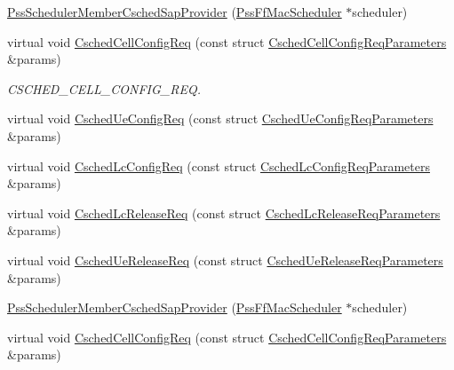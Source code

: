 \begin{DoxyCompactItemize}
\item 
\hyperlink{classns3_1_1PssSchedulerMemberCschedSapProvider_a7d005ca73b85cdd1162b1fc10912025b}{Pss\+Scheduler\+Member\+Csched\+Sap\+Provider} (\hyperlink{classns3_1_1PssFfMacScheduler}{Pss\+Ff\+Mac\+Scheduler} $\ast$scheduler)
\item 
virtual void \hyperlink{classns3_1_1PssSchedulerMemberCschedSapProvider_ac6119cf011f6559c7300ad1a307265b3}{Csched\+Cell\+Config\+Req} (const struct \hyperlink{structns3_1_1FfMacCschedSapProvider_1_1CschedCellConfigReqParameters}{Csched\+Cell\+Config\+Req\+Parameters} \&params)
\begin{DoxyCompactList}\small\item\em C\+S\+C\+H\+E\+D\+\_\+\+C\+E\+L\+L\+\_\+\+C\+O\+N\+F\+I\+G\+\_\+\+R\+EQ. \end{DoxyCompactList}\item 
virtual void \hyperlink{classns3_1_1PssSchedulerMemberCschedSapProvider_a66d0d3d2e4fa66eaf87375dbefe09cbe}{Csched\+Ue\+Config\+Req} (const struct \hyperlink{structns3_1_1FfMacCschedSapProvider_1_1CschedUeConfigReqParameters}{Csched\+Ue\+Config\+Req\+Parameters} \&params)
\item 
virtual void \hyperlink{classns3_1_1PssSchedulerMemberCschedSapProvider_ac759acac77492a6dfa2b1f265f6cd46a}{Csched\+Lc\+Config\+Req} (const struct \hyperlink{structns3_1_1FfMacCschedSapProvider_1_1CschedLcConfigReqParameters}{Csched\+Lc\+Config\+Req\+Parameters} \&params)
\item 
virtual void \hyperlink{classns3_1_1PssSchedulerMemberCschedSapProvider_a5866508a403aa114e5445dc4a1a211bc}{Csched\+Lc\+Release\+Req} (const struct \hyperlink{structns3_1_1FfMacCschedSapProvider_1_1CschedLcReleaseReqParameters}{Csched\+Lc\+Release\+Req\+Parameters} \&params)
\item 
virtual void \hyperlink{classns3_1_1PssSchedulerMemberCschedSapProvider_ae852c78c2ce9f43b5264e39f64f15c38}{Csched\+Ue\+Release\+Req} (const struct \hyperlink{structns3_1_1FfMacCschedSapProvider_1_1CschedUeReleaseReqParameters}{Csched\+Ue\+Release\+Req\+Parameters} \&params)
\item 
\hyperlink{classns3_1_1PssSchedulerMemberCschedSapProvider_a7d005ca73b85cdd1162b1fc10912025b}{Pss\+Scheduler\+Member\+Csched\+Sap\+Provider} (\hyperlink{classns3_1_1PssFfMacScheduler}{Pss\+Ff\+Mac\+Scheduler} $\ast$scheduler)
\item 
virtual void \hyperlink{classns3_1_1PssSchedulerMemberCschedSapProvider_a44220921533e8dcf8a8ba1ff55f058c4}{Csched\+Cell\+Config\+Req} (const struct \hyperlink{structns3_1_1FfMacCschedSapProvider_1_1CschedCellConfigReqParameters}{Csched\+Cell\+Config\+Req\+Parameters} \&params)

\end{DoxyCompactItemize}
